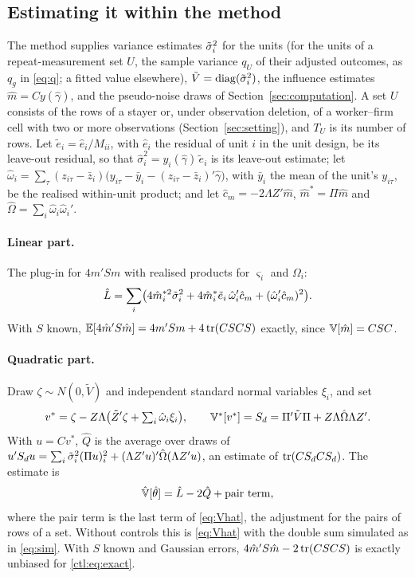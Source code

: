 \subsection{Estimating it within the method}\label{ctl:est}

The method supplies variance estimates $\tilde\sigma_i^2$ for the units (for the units of a repeat-measurement set $U$,
the sample variance $q_U$ of their adjusted outcomes, as $q_g$ in \eqref{eq:q}; a fitted value elsewhere),
$\tilde V=\operatorname{diag}(\tilde\sigma_i^2)$, the influence estimates $\hat m=Cy(\hat\gamma)$, and the pseudo-noise draws of
Section~\ref{sec:computation}. A set $U$ consists of the rows of a stayer or, under observation deletion, of a
worker--firm cell with two or more observations (Section~\ref{sec:setting}), and $T_U$ is its number of rows. Let
$\tilde e_i=\hat e_i/M_{ii}$, with $\hat e_i$ the residual of unit $i$ in the unit design, be its leave-out residual,
so that $\hat\sigma_i^2=y_i(\hat\gamma)\,\tilde e_i$ is its leave-out estimate; let
$\hat\omega_i=\sum_\tau(z_{i\tau}-\bar z_i)\bigl(y_{i\tau}-\bar y_i-(z_{i\tau}-\bar z_i)'\hat\gamma\bigr)$, with $\bar
y_i$ the mean of the unit's $y_{i\tau}$, be the realised within-unit product; and let $\hat c_m=-2\Lambda Z'\hat m$,
$\hat m^*=\Pi\hat m$ and $\hat\Omega=\sum_i\hat\omega_i\hat\omega_i'$.

\paragraph{Linear part.} The plug-in for $4m'Sm$ with realised products for $\varsigma_i$ and $\Omega_i$:
\begin{equation}\label{ctl:eq:Lhat}
 \hat L=\sum_i\bigl(4\hat m_i^{*2}\tilde\sigma_i^2+4\hat m_i^*\tilde e_i\,\hat\omega_i'\hat c_m+(\hat\omega_i'\hat c_m)^2\bigr).
\end{equation}
With $S$ known, $\mathbb{E}[4\hat m'S\hat m]=4m'Sm+4\operatorname{tr}(CSCS)$ exactly, since $\mathbb{V}[\hat m]=CSC$.

\paragraph{Quadratic part.} Draw $\zeta\sim N(0,\tilde V)$ and independent standard normal variables $\xi_i$,
and set
\begin{equation}\label{ctl:eq:draw}
 v^*=\zeta-Z\Lambda\bigl(\tilde Z'\zeta+\textstyle\sum_i\hat\omega_i\xi_i\bigr),\qquad
 \mathbb{V}^*[v^*]=S_d=\Pi'\tilde V\Pi+Z\Lambda\hat\Omega\Lambda Z' .
\end{equation}
With $u=Cv^*$, $\hat Q$ is the average over draws of $u'S_du=\sum_i\tilde\sigma_i^2(\Pi u)_i^2+
(\Lambda Z'u)'\hat\Omega(\Lambda Z'u)$, an estimate of $\operatorname{tr}(CS_dCS_d)$. The estimate is
\begin{equation}\label{ctl:eq:Vhat}
 \hat{\mathbb{V}}[\hat\theta]=\hat L-2\hat Q+\text{pair term},
\end{equation}
where the pair term is the last term of \eqref{eq:Vhat}, the adjustment for the pairs of rows of a set. Without
controls this is \eqref{eq:Vhat} with the double sum simulated as in \eqref{eq:sim}. With $S$ known and Gaussian
errors, $4\hat m'S\hat m-2\operatorname{tr}(CSCS)$ is exactly unbiased for \eqref{ctl:eq:exact}.

